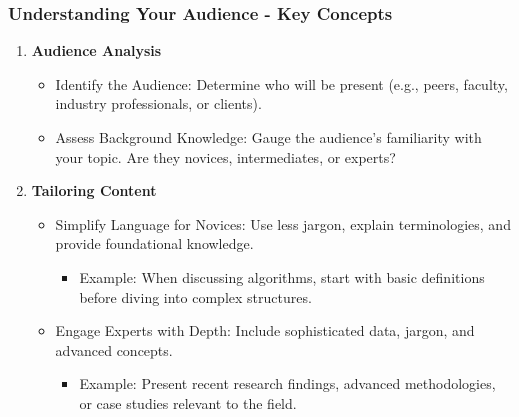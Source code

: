 \documentclass{beamer}
\begin{document}
\begin{frame}[fragile]
    \frametitle{Understanding Your Audience - Key Concepts}
    \begin{enumerate}
        \item \textbf{Audience Analysis}
        \begin{itemize}
            \item Identify the Audience: Determine who will be present (e.g., peers, faculty, industry professionals, or clients).
            \item Assess Background Knowledge: Gauge the audience's familiarity with your topic. Are they novices, intermediates, or experts?
        \end{itemize}
        
        \item \textbf{Tailoring Content}
        \begin{itemize}
            \item Simplify Language for Novices: Use less jargon, explain terminologies, and provide foundational knowledge.
            \begin{itemize}
                \item Example: When discussing algorithms, start with basic definitions before diving into complex structures.
            \end{itemize}
            \item Engage Experts with Depth: Include sophisticated data, jargon, and advanced concepts.
            \begin{itemize}
                \item Example: Present recent research findings, advanced methodologies, or case studies relevant to the field.
            \end{itemize}
        \end{itemize}
    \end{enumerate}
\end{frame}
\end{document}
